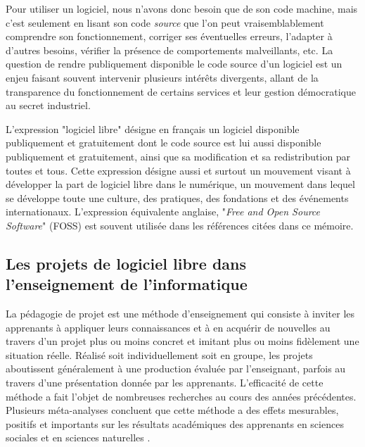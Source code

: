 \documentclass[twocolumn,dvipsnames]{llncs}
\newcommand{\en}[1]{\foreignlanguage{english}{\todo{fix weird hspace}\emph{#1}}}
\begin{document}
    Pour utiliser un logiciel, nous n'avons donc besoin que de son code machine,
    mais c'est seulement en lisant son code \emph{source} que l'on peut
    vraisemblablement comprendre son fonctionnement, corriger ses éventuelles
    erreurs, l'adapter à d'autres besoins, vérifier la présence de comportements
    malveillants, etc. La question de rendre publiquement disponible le code
    source d'un logiciel est un enjeu faisant souvent intervenir plusieurs
    intérêts divergents, allant de la transparence du fonctionnement de certains
    services et leur gestion démocratique au secret industriel.

    L'expression "logiciel libre" désigne en français un logiciel disponible
    publiquement et gratuitement dont le code source est lui aussi disponible
    publiquement et gratuitement, ainsi que sa modification et sa redistribution
    par toutes et tous. Cette expression désigne aussi et surtout un mouvement
    visant à développer la part de logiciel libre dans le numérique, un
    mouvement dans lequel se développe toute une culture, des pratiques, des
    fondations et des événements internationaux. L'expression équivalente
    anglaise, "\en{Free and Open Source Software}" (FOSS) est souvent utilisée
    dans les références citées dans ce mémoire.

    \subsection{Les projets de logiciel libre dans l'enseignement de l'informatique}
    La pédagogie de projet est une méthode d'enseignement qui consiste à inviter
    les apprenants à appliquer leurs connaissances et à en acquérir de nouvelles
    au travers d'un projet plus ou moins concret et imitant plus ou moins
    fidèlement une situation réelle. Réalisé soit individuellement soit en
    groupe, les projets aboutissent généralement à une production évaluée par
    l'enseignant, parfois au travers d'une présentation donnée par les
    apprenants. L'efficacité de cette méthode a fait l'objet de nombreuses
    recherches au cours des années précédentes. Plusieurs méta-analyses
    concluent que cette méthode a des effets mesurables, positifs et importants
    sur les résultats académiques des apprenants en sciences sociales et en
    sciences naturelles \cite{pbl-2019, pbl-2018}.
\end{document}
